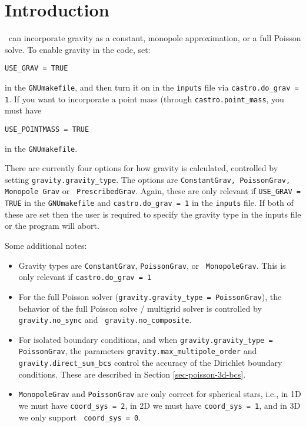 \section{Introduction}

\castro\ can incorporate gravity as a constant, monopole approximation,
or a full Poisson solve.  To enable gravity in the code, set:
\begin{verbatim}
USE_GRAV = TRUE
\end{verbatim}
in the {\tt GNUmakefile}, and then turn it on in the {\tt inputs} file
via {\tt castro.do\_grav = 1}.  If you want to incorporate a point mass
(through {\tt castro.point\_mass}, you must have
\begin{verbatim}
USE_POINTMASS = TRUE
\end{verbatim}
in the {\tt GNUmakefile}.

There are currently four options for how gravity is calculated,
controlled by setting {\tt gravity.gravity\_type}.  The options are
{\tt ConstantGrav, PoissonGrav, Monopole Grav} or {\tt
  PrescribedGrav}.  Again, these are only relevant if {\tt USE\_GRAV =
  TRUE} in the {\tt GNUmakefile} and {\tt castro.do\_grav = 1} in the
{\tt inputs} file.  If both of these are set then the user is required
to specify the gravity type in the inputs file or the program will
abort.

Some additional notes:
\begin{itemize}

\item Gravity types are {\tt ConstantGrav}, {\tt PoissonGrav}, or {\tt
  MonopoleGrav}.  This is only relevant if {\tt castro.do\_grav = 1}

\item For the full Poisson solver ({\tt gravity.gravity\_type =
  PoissonGrav}), the behavior of the full Poisson solve / multigrid
solver is controlled by {\tt gravity.no\_sync} and {\tt
  gravity.no\_composite}.

\item For isolated boundary conditions, and when {\tt gravity.gravity\_type
  = PoissonGrav}, the parameters {\tt gravity.max\_multipole\_order}
and {\tt gravity.direct\_sum\_bcs} control the accuracy of the
Dirichlet boundary conditions.  These are described in Section
\ref{sec-poisson-3d-bcs}.

\item {\tt MonopoleGrav} and {\tt PoissonGrav} are only correct for
  spherical stars, i.e., in 1D we must have {\tt coord\_sys = 2}, in
  2D we must have {\tt coord\_sys = 1}, and in 3D we only support {\tt
    coord\_sys = 0}.
\end{itemize}

